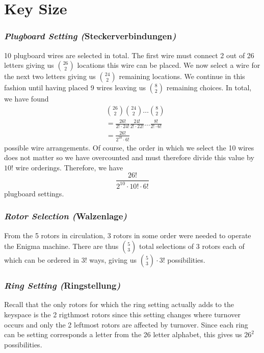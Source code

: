 \section{Key Size}

\subsubsection{\emph{Plugboard Setting (}Steckerverbindungen\emph{)}}
10 plugboard wires are selected in total. The first wire must connect
2 out of 26 letters giving us ${26\choose2}$ locations this wire can
be placed. We now select a wire for the next two letters giving us
${24\choose2}$ remaining locations. We continue in this fashion until
having placed 9 wires leaving us ${8\choose2}$ remaining choices. In
total, we have found
\begin{align*}
	 & {26\choose2}{24\choose2}\dots{8\choose2}                                  \\
	 & =\frac{26!}{2!\cdot 24!}\frac{24!}{2!\cdot 22!}\dots\frac{8!}{2!\cdot 6!} \\
	 & =\frac{26!}{2^{10}\cdot6!}
\end{align*}
possible wire arrangements. Of course, the order in which we select
the 10 wires does not matter so we have overcounted and must
therefore divide this value by $10!$ wire orderings. Therefore, we have
\[
	\frac{26!}{2^{10}\cdot 10! \cdot 6!}
\]
plugboard settings.

\subsubsection{\emph{Rotor Selection (}Walzenlage\emph{)}}
From the 5 rotors in circulation, 3 rotors in some order were needed
to operate the Enigma machine. There are thus ${5}\choose{3}$ total
selections of 3 rotors each of which can be ordered in $3!$ ways,
giving us ${5\choose3}\cdot{3!}$ possibilities.

\subsubsection{\emph{Ring Setting (}Ringstellung\emph{)}}
Recall that the only rotors for which the ring setting actually adds
to the keyspace is the 2 rigthmost rotors since this setting changes
where turnover occurs and only the 2 leftmost rotors are affected by
turnover. Since each ring can be setting corresponds a letter from
the 26 letter alphabet, this gives us $26^2$ possibilities.

